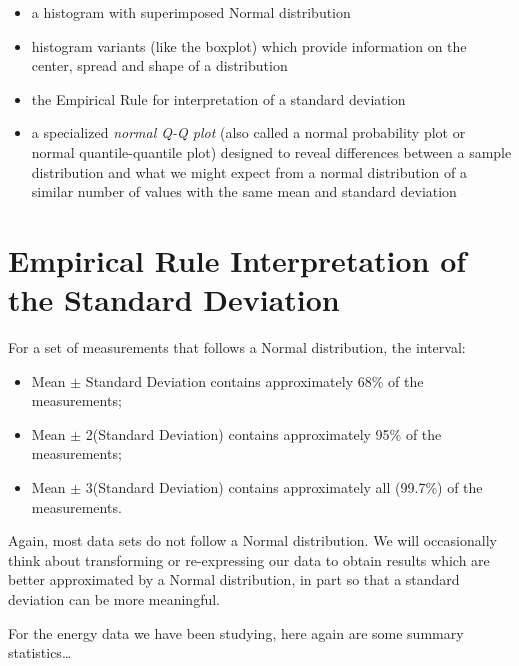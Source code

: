 \documentclass[
]{book}
\newenvironment{Shaded}{\begin{snugshade}}{\end{snugshade}}
\newcommand{\KeywordTok}[1]{\textcolor[rgb]{0.13,0.29,0.53}{\textbf{#1}}}
\newcommand{\NormalTok}[1]{#1}
\newcommand{\OperatorTok}[1]{\textcolor[rgb]{0.81,0.36,0.00}{\textbf{#1}}}
\providecommand{\tightlist}{%
  \setlength{\itemsep}{0pt}\setlength{\parskip}{0pt}}
\begin{document}
\begin{itemize}
\tightlist
\item
  a histogram with superimposed Normal distribution
\item
  histogram variants (like the boxplot) which provide information on the center, spread and shape of a distribution
\item
  the Empirical Rule for interpretation of a standard deviation
\item
  a specialized \emph{normal Q-Q plot} (also called a normal probability plot or normal quantile-quantile plot) designed to reveal differences between a sample distribution and what we might expect from a normal distribution of a similar number of values with the same mean and standard deviation
\end{itemize}

\hypertarget{empirical-rule-interpretation-of-the-standard-deviation}{%
\section{Empirical Rule Interpretation of the Standard Deviation}\label{empirical-rule-interpretation-of-the-standard-deviation}}

For a set of measurements that follows a Normal distribution, the interval:

\begin{itemize}
\tightlist
\item
  Mean \(\pm\) Standard Deviation contains approximately 68\% of the measurements;
\item
  Mean \(\pm\) 2(Standard Deviation) contains approximately 95\% of the measurements;
\item
  Mean \(\pm\) 3(Standard Deviation) contains approximately all (99.7\%) of the measurements.
\end{itemize}

Again, most data sets do not follow a Normal distribution. We will occasionally think about transforming or re-expressing our data to obtain results which are better approximated by a Normal distribution, in part so that a standard deviation can be more meaningful.

For the energy data we have been studying, here again are some summary statistics\ldots{}

\begin{Shaded}
\end{Shaded}
\end{document}
